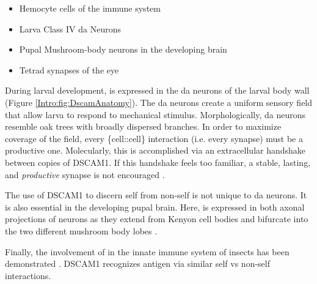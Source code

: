     \begin{itemize} \itemsep0.5pt \parskip0pt  %
      \singlespacing
      \item Hemocyte cells of the immune system
      \item Larva Class IV da Neurons 
      \item Pupal Mushroom-body neurons in the developing brain
      \item Tetrad synapses of the eye
      \end{itemize}

    During larval development, \dscam{} is expressed in the da neurons of the larval body wall (Figure \ref{Intro:fig:DscamAnatomy}). The da neurons create a uniform sensory field that allow larva to respond to mechanical stimulus. Morphologically, da neurons resemble oak trees with broadly dispersed branches. In order to maximize coverage of the field, every \{cell::cell\} interaction (i.e. every synapse) must be a productive one. Molecularly, this is accomplished via an extracellular handshake between copies of DSCAM1. If this handshake feels too familiar, a stable, lasting, and \textit{productive} synapse is not encouraged \citep{Wojtowicz2004}. 

    The use of DSCAM1 to discern self from non-self is not unique to da neurons. It is also essential in the developing pupal brain. Here, \dscam{} is expressed in both axonal projections of neurons as they extend from Kenyon cell bodies and bifurcate into the two different mushroom body lobes \citep{Zhan2004}. 

    Finally, the involvement of \dscam{} in the innate immune system of insects has been demonstrated \citep{Watson2005,Dong2006}. DSCAM1 recognizes antigen via similar self vs non-self interactions.

